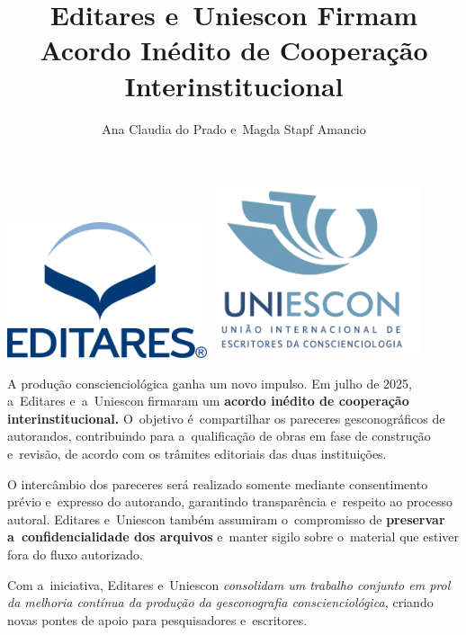 \documentclass{gescons}
\author{Ana Claudia do Prado e~Magda Stapf Amancio}
\title{Editares e~Uniescon Firmam Acordo Inédito de Cooperação Interinstitucional}
\begin{document}
    \makeentrevistatitle


    
    
\begin{center}
    \includegraphics[height=4cm]{images/Logo-Editares-com-Marca-Registrada}
    \hspace{3cm}
    \includegraphics[height=5cm]{images/Logo-UNIESCON-2048x1741} 
    
\end{center}
    
    \begin{multicols}{2}

A produção conscienciológica ganha um novo impulso. Em julho de 2025, a~Editares e~a~Uniescon firmaram um \textbf{acordo inédito de cooperação interinstitucional.} O~objetivo é~compartilhar os pareceres gesconográficos de autorandos, contribuindo para a~qualificação de obras em fase de construção e~revisão, de acordo com os trâmites editoriais das duas instituições.

O intercâmbio dos pareceres será realizado somente mediante consentimento prévio e~expresso do autorando, garantindo transparência e~respeito ao processo autoral. Editares e~Uniescon também assumiram o~compromisso de \textbf{preservar a~confidencialidade dos arquivos} e~manter sigilo sobre o~material que estiver fora do fluxo autorizado.

Com a~iniciativa, Editares e~Uniescon \emph{consolidam um trabalho conjunto em prol da melhoria contínua da produção da gesconografia conscienciológica,} criando novas pontes de apoio para pesquisadores e~escritores.



    \end{multicols}
\end{document}
